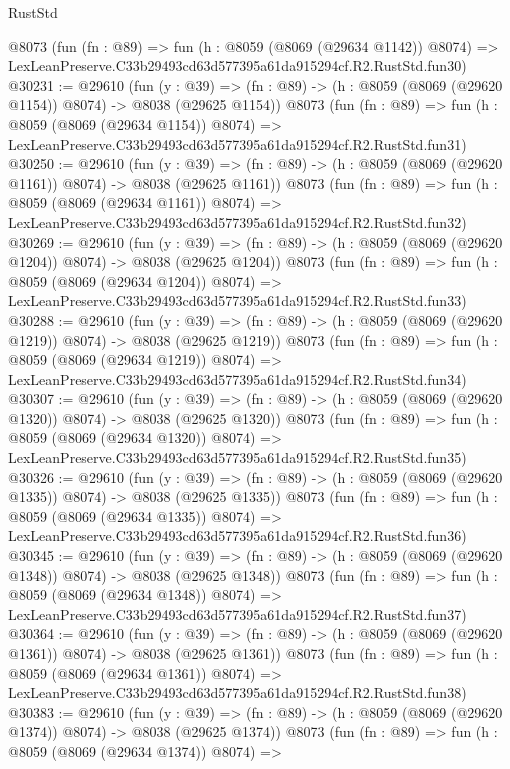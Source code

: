 \begin{lexlean}{RustStd}
\begin{coremodule}
    @8073
    (fun (fn : @89) =>
    fun (h : @8059 (@8069 (@29634 @1142)) @8074) =>
    LexLeanPreserve.C33b29493cd63d577395a61da915294cf.R2.RustStd.fun30)
@30231 := @29610
    (fun (y : @39) =>
    (fn : @89) -> (h : @8059 (@8069 (@29620 @1154)) @8074) -> @8038 (@29625 @1154))
    @8073
    (fun (fn : @89) =>
    fun (h : @8059 (@8069 (@29634 @1154)) @8074) =>
    LexLeanPreserve.C33b29493cd63d577395a61da915294cf.R2.RustStd.fun31)
@30250 := @29610
    (fun (y : @39) =>
    (fn : @89) -> (h : @8059 (@8069 (@29620 @1161)) @8074) -> @8038 (@29625 @1161))
    @8073
    (fun (fn : @89) =>
    fun (h : @8059 (@8069 (@29634 @1161)) @8074) =>
    LexLeanPreserve.C33b29493cd63d577395a61da915294cf.R2.RustStd.fun32)
@30269 := @29610
    (fun (y : @39) =>
    (fn : @89) -> (h : @8059 (@8069 (@29620 @1204)) @8074) -> @8038 (@29625 @1204))
    @8073
    (fun (fn : @89) =>
    fun (h : @8059 (@8069 (@29634 @1204)) @8074) =>
    LexLeanPreserve.C33b29493cd63d577395a61da915294cf.R2.RustStd.fun33)
@30288 := @29610
    (fun (y : @39) =>
    (fn : @89) -> (h : @8059 (@8069 (@29620 @1219)) @8074) -> @8038 (@29625 @1219))
    @8073
    (fun (fn : @89) =>
    fun (h : @8059 (@8069 (@29634 @1219)) @8074) =>
    LexLeanPreserve.C33b29493cd63d577395a61da915294cf.R2.RustStd.fun34)
@30307 := @29610
    (fun (y : @39) =>
    (fn : @89) -> (h : @8059 (@8069 (@29620 @1320)) @8074) -> @8038 (@29625 @1320))
    @8073
    (fun (fn : @89) =>
    fun (h : @8059 (@8069 (@29634 @1320)) @8074) =>
    LexLeanPreserve.C33b29493cd63d577395a61da915294cf.R2.RustStd.fun35)
@30326 := @29610
    (fun (y : @39) =>
    (fn : @89) -> (h : @8059 (@8069 (@29620 @1335)) @8074) -> @8038 (@29625 @1335))
    @8073
    (fun (fn : @89) =>
    fun (h : @8059 (@8069 (@29634 @1335)) @8074) =>
    LexLeanPreserve.C33b29493cd63d577395a61da915294cf.R2.RustStd.fun36)
@30345 := @29610
    (fun (y : @39) =>
    (fn : @89) -> (h : @8059 (@8069 (@29620 @1348)) @8074) -> @8038 (@29625 @1348))
    @8073
    (fun (fn : @89) =>
    fun (h : @8059 (@8069 (@29634 @1348)) @8074) =>
    LexLeanPreserve.C33b29493cd63d577395a61da915294cf.R2.RustStd.fun37)
@30364 := @29610
    (fun (y : @39) =>
    (fn : @89) -> (h : @8059 (@8069 (@29620 @1361)) @8074) -> @8038 (@29625 @1361))
    @8073
    (fun (fn : @89) =>
    fun (h : @8059 (@8069 (@29634 @1361)) @8074) =>
    LexLeanPreserve.C33b29493cd63d577395a61da915294cf.R2.RustStd.fun38)
@30383 := @29610
    (fun (y : @39) =>
    (fn : @89) -> (h : @8059 (@8069 (@29620 @1374)) @8074) -> @8038 (@29625 @1374))
    @8073
    (fun (fn : @89) =>
    fun (h : @8059 (@8069 (@29634 @1374)) @8074) =>

\end{coremodule}
\end{lexlean}
